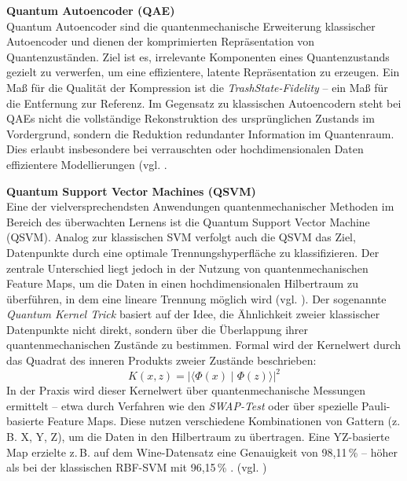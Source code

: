 \textbf{Quantum Autoencoder (QAE)}\\
Quantum Autoencoder sind die quantenmechanische Erweiterung klassischer Autoencoder und dienen der komprimierten Repräsentation von Quantenzuständen. Ziel ist es, irrelevante Komponenten eines Quantenzustands gezielt zu verwerfen, um eine effizientere, latente Repräsentation zu erzeugen. Ein Maß für die Qualität der Kompression ist die \textit{TrashState-Fidelity} – ein Maß für die Entfernung zur Referenz. Im Gegensatz zu klassischen Autoencodern steht bei QAEs nicht die vollständige Rekonstruktion des ursprünglichen Zustands im Vordergrund, sondern die Reduktion redundanter Information im Quantenraum. Dies erlaubt insbesondere bei verrauschten oder hochdimensionalen Daten effizientere Modellierungen (vgl. \cite{ngairangbam_anomaly_2022, schuld_et_al_quantum_2019}.

\textbf{Quantum Support Vector Machines (QSVM)}\\
Eine der vielversprechendsten Anwendungen quantenmechanischer Methoden im Bereich des überwachten Lernens ist die Quantum Support Vector Machine (QSVM). Analog zur klassischen SVM verfolgt auch die QSVM das Ziel, Datenpunkte durch eine optimale Trennungshyperfläche zu klassifizieren. Der zentrale Unterschied liegt jedoch in der Nutzung von quantenmechanischen Feature Maps, um die Daten in einen hochdimensionalen Hilbertraum zu überführen, in dem eine lineare Trennung möglich wird (vgl. \cite{kavithaQuantumMachineLearning2024}).
Der sogenannte \textit{Quantum Kernel Trick} basiert auf der Idee, die Ähnlichkeit zweier klassischer Datenpunkte nicht direkt, sondern über die Überlappung ihrer quantenmechanischen Zustände zu bestimmen. Formal wird der Kernelwert durch das Quadrat des inneren Produkts zweier Zustände beschrieben:
\[
K(x, z) = \left| \langle \Phi(x) \mid \Phi(z) \rangle \right|^2
\]
In der Praxis wird dieser Kernelwert über quantenmechanische Messungen ermittelt – etwa durch Verfahren wie den \textit{SWAP-Test} oder über spezielle Pauli-basierte Feature Maps. Diese nutzen verschiedene Kombinationen von Gattern (z.\,B. X, Y, Z), um die Daten in den Hilbertraum zu übertragen. Eine YZ-basierte Map erzielte z.\,B. auf dem Wine-Datensatz eine Genauigkeit von 98{,}11\,\% – höher als bei der klassischen RBF-SVM mit 96{,}15\,\% . (vgl. \cite{kavithaQuantumMachineLearning2024})

